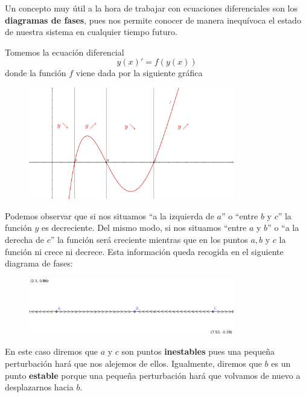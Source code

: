 Un concepto muy útil a la hora de trabajar con ecuaciones diferenciales son los \textbf{diagramas de fases}, pues nos permite conocer de manera inequívoca el estado de nuestra sistema en cualquier tiempo futuro.

Tomemos la ecuación diferencial
\[y(x)'=f(y(x))\]
donde la función $f$ viene dada por la siguiente gráfica

\begin{figure}[hbtp]
\centering
\includegraphics[width = 0.8\textwidth]{img/propiedades-autonomas.png}
\end{figure}

Podemos observar que si nos situamos ``a la izquierda de $a$'' o ``entre $b$ y $c$'' la función $y$ es decreciente. Del mismo modo, si nos situamos ``entre $a$ y $b$'' o ``a la derecha de $c$'' la función será creciente mientras que en los puntos $a, b$ y $c$ la función ni crece ni decrece. Esta información queda recogida en el siguiente diagrama de fases:

\begin{figure}[hbtp]
\centering
\includegraphics[width = 0.8\textwidth]{img/diagrama-fases.png}
\end{figure}

En este caso diremos que $a$ y $c$ son puntos \textbf{inestables} pues una pequeña perturbación hará que nos alejemos de ellos. Igualmente, diremos que $b$ es un punto \textbf{estable} porque una pequeña perturbación hará que volvamos de nuevo a desplazarnos hacia $b$.

